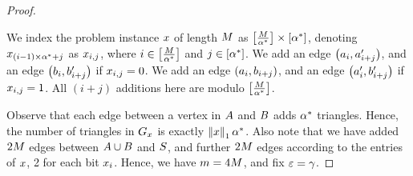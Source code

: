 \begin{proof}
{\begin{itemize}
        We index the problem instance $x$ of length $M$ as $\left[{\frac{M}{\alpha^*}}\right]\times\left[{\alpha^*}\right]$, denoting  $x_{\left({i-1}\right)\times\alpha^*+j}$ as $x_{i,j}$, where $i \in \left[{\frac{M}{\alpha^*}}\right]$ and $j \in \left[{\alpha^*}\right]$. We add an edge $\left({a_i,a'_{i+j}}\right)$, and an edge $\left({b_i,b'_{i+j}}\right)$ if $x_{i,j} = 0$. We add an edge $\left({a_i,b_{i+j}}\right)$, and an edge $\left({a'_i,b'_{i+j}}\right)$ if $x_{i,j} = 1$. All $(i+j)$ additions here are modulo $\left[{\frac{M}{\alpha^*}}\right]$.
    \end{itemize}
      }

      
    Observe that each edge between a vertex in $A$ and $B$ adds $\alpha^*$ triangles. Hence, the number of triangles in ${G_{x}}$ is exactly $\left\|{x}\right\|_1\alpha^*$. Also note that we have added $2M$ edges between $A\cup B$ and $S$, and further $2M$ edges according to the entries of $x$, 2 for each bit $x_i$. Hence, we have $m = 4M$, and fix $\varepsilon = \gamma$. 
    


\end{proof}

